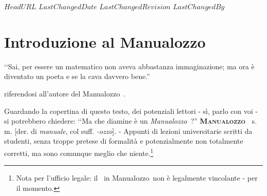 \svnidlong
{$HeadURL$}
{$LastChangedDate$}
{$LastChangedRevision$}
{$LastChangedBy$}

\chapter*{Introduzione al Manualozzo\texttrademark\ }
\thispagestyle{empty}
\begin{introduction}
‘‘Sai, per essere un matematico non aveva abbastanza immaginazione; ma ora è diventato un poeta e se la cava davvero bene.''
\begin{flushright}
	 riferendosi  all'autore del Manualozzo\texttrademark\ .
\end{flushright}
\end{introduction}
\noindent Guardando la copertina di questo testo, dei potenziali lettori - sì, parlo con voi - si potrebbero chiedere: ‘‘Ma che diamine è un \textit{Manualozzo\texttrademark\ }?''
\vspace{3mm}
\lettrine[findent=1pt, nindent=0pt]{\textbf{M}}{\textbf{anualozzo\texttrademark\ }} s. m. [der. di \textit{manuale}, col suff. \textit{-ozzo}]. - Appunti di lezioni universitarie scritti da studenti, senza troppe pretese di formalità e potenzialmente non totalmente corretti, ma sono comunque meglio che niente.\footnote{Nota per l'ufficio legale: il \texttrademark\ in Manualozzo\texttrademark\ non è legalmente vincolante - per il momento.}
\vspace{3mm}\\

